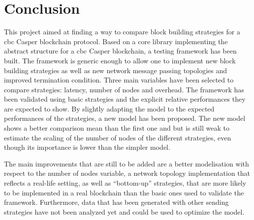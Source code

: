 \chapter{Conclusion}
\label{chap:conclusion}

This project aimed at finding a way to compare block building strategies for a
\gls{cbc} Casper blockchain protocol. Based on a core library implementing the
abstract structure for a \gls{cbc} Casper blockchain, a testing framework has
been built. The framework is generic enough to allow one to implement new block
building strategies as well as new network message passing topologies and
improved termination condition. Three main variables have been selected to
compare strategies: latency, number of nodes and overhead. The framework has
been validated using basic strategies and the explicit relative performances
they are expected to show. By slightly adapting the model to the expected
performances of the strategies, a new model has been proposed. The new model
shows a better comparison mean than the first one and but is still weak to
estimate the scaling of the number of nodes of the different strategies, even
though its importance is lower than the simpler model.

The main improvements that are still to be added are a better modelisation with
respect to the number of nodes variable, a network topology
implementation that reflects a real-life setting, as well as ``bottom-up''
strategies, that are more likely to be implemented in a real blockchain than the
basic ones used to validate the framework. Furthermore, data that has been
generated with other sending strategies have not been analyzed yet and could be
used to optimize the model.
